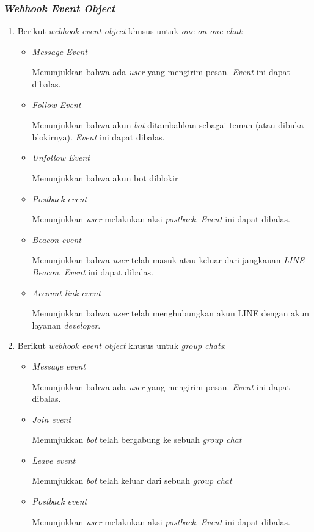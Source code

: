 \subsubsection{\textit{Webhook Event Object}}
\begin{enumerate}
\item Berikut \textit{webhook event object} khusus untuk \textit{one-on-one chat}:

\begin{itemize}
\item \textit{Message Event}

Menunjukkan bahwa ada \textit{user} yang mengirim pesan. \textit{Event} ini dapat dibalas.

\item \textit{Follow Event}

Menunjukkan bahwa akun \textit{bot} ditambahkan sebagai teman (atau dibuka blokirnya). \textit{Event} ini dapat dibalas.

\item \textit{Unfollow Event}

Menunjukkan bahwa akun bot diblokir

\item \textit{Postback event}

Menunjukkan \textit{user} melakukan aksi \textit{postback}. \textit{Event} ini dapat dibalas.

\item \textit{Beacon event}

Menunjukkan bahwa \textit{user} telah masuk atau keluar dari jangkauan \textit{LINE Beacon}. \textit{Event} ini dapat dibalas.

\item \textit{Account link event }

Menunjukkan bahwa \textit{user} telah menghubungkan akun LINE dengan akun layanan \textit{developer}. 

\end{itemize}

\item Berikut \textit{webhook event object} khusus untuk \textit{group chats}:

\begin{itemize}
\item \textit{Message event}

Menunjukkan bahwa ada \textit{user} yang mengirim pesan. \textit{Event} ini dapat dibalas.

\item \textit{Join event}

Menunjukkan \textit{bot} telah bergabung ke sebuah \textit{group chat}

\item \textit{Leave event}

Menunjukkan \textit{bot} telah keluar dari sebuah \textit{group chat}

\item \textit{Postback event}

Menunjukkan \textit{user} melakukan aksi \textit{postback}. \textit{Event} ini dapat dibalas.

\end{itemize}

\end{enumerate}


